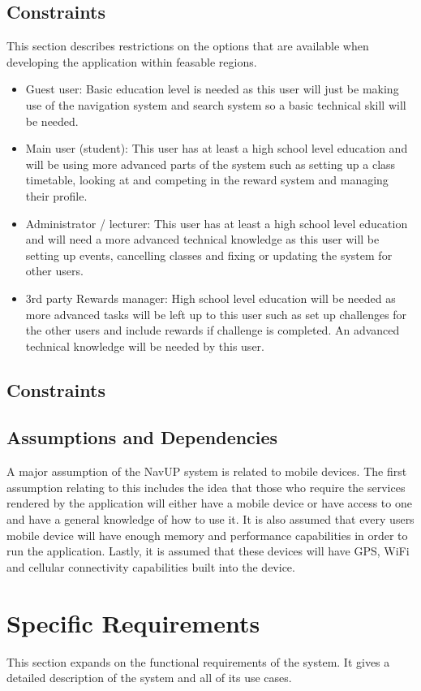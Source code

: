 \documentclass{article}
\begin{document}
	\subsection{Constraints}
	This section describes restrictions on the options that are available when developing the application within feasable regions.
		\begin{itemize}

\item Guest user: Basic education level is needed as this user will just be making use of the navigation system and search system so a basic technical skill will be needed.
\item Main user (student): This user has at least a high school level education and will be using more advanced parts of the system such as setting up a class timetable, looking at and competing in the reward system and managing their profile.
\item Administrator / lecturer: This user has at least a high school level education and will need a more advanced technical knowledge as this user will be setting up events, cancelling classes and fixing or updating the system for other users.  
\item 3rd party Rewards manager: High school level education will be needed as more advanced tasks will be left up to this user such as set up challenges for the other users and include rewards if challenge is completed. An advanced technical knowledge will be needed by this user.

	\end{itemize}
	\subsection{Constraints}
	\subsection{Assumptions and Dependencies}
		A major assumption of the NavUP system is related to mobile devices. The first assumption relating to this includes the idea that those who require the services rendered by the application will either have a mobile device or have access to one and have a general knowledge of how to use it. It is also assumed that every users mobile device will have enough memory and performance capabilities in order to run the application. Lastly, it is assumed that these devices will have GPS, WiFi and cellular connectivity capabilities built into the device.
	
	\section{Specific Requirements}
	This section expands on the functional requirements of the system. It gives a detailed 	description of the system and all of its use cases.
	
\end{document}
